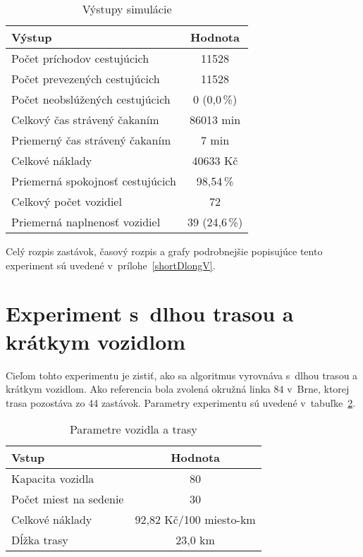 \begin{table}[h]
  \centering
  \begin{tabular}{|l|c|}
    \hline
      \textbf{Výstup} & \textbf{Hodnota} \\ \hline
      Počet príchodov cestujúcich & 11528 \\ \hline
      Počet prevezených cestujúcich & 11528 \\ \hline
      Počet neobslúžených cestujúcich & 0 (0,0\,\%) \\ \hline
      Celkový čas strávený čakaním & 86013 min \\ \hline
      Priemerný čas strávený čakaním & 7 min \\ \hline
      Celkové náklady & 40633 Kč \\ \hline
      Priemerná spokojnosť cestujúcich & 98,54\,\% \\ \hline
      Celkový počet vozidiel & 72 \\ \hline
      Priemerná naplnenosť vozidiel & 39 (24,6\,\%) \\ \hline
  \end{tabular}
  \caption{Výstupy simulácie}
  \label{tab:shortDlongVout}
\end{table}

Celý rozpis zastávok, časový rozpis a grafy podrobnejšie popisujúce tento experiment sú uvedené v~prílohe~\ref{shortDlongV}.

\newpage

\section{Experiment s~dlhou trasou a krátkym vozidlom}
Cieľom tohto experimentu je zistiť, ako sa algoritmus vyrovnáva s~dlhou trasou a krátkym vozidlom.
Ako referencia bola zvolená okružná linka 84 v~Brne, ktorej trasa pozostáva zo 44 zastávok.
Parametry experimentu sú uvedené v~tabuľke~\ref{tab:longDshortVin}.

\begin{table}[h]
  \centering
  \begin{tabular}{|l|c|}
    \hline
    \textbf{Vstup} & \textbf{Hodnota} \\ \hline
    Kapacita vozidla & 80 \\ \hline
    Počet miest na sedenie & 30 \\ \hline
    Celkové náklady & 92,82 Kč/100 miesto-km \\ \hline
    Dĺžka trasy & 23,0 km \\ \hline
  \end{tabular}
  \caption{Parametre vozidla a trasy}
  \label{tab:longDshortVin}
\end{table}

